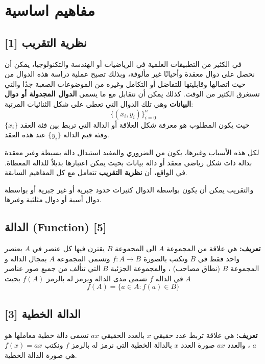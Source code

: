 \chapter{مفاهيم اساسية}
	
	\section{نظرية التقريب  [1]}
	
	في الكثير من التطبيقات العلمية في الرياضيات أو الهندسة والتكنولوجيا، يمكن أن نحصل على دوال معقدة وأحيانًا غير مألوفة، وبذلك تصبح عملية دراسة هذه الدوال من حيث اتصالها وقابليتها للتفاضل أو التكامل وغيره من الموضوعات الصعبة جدًا والتي تستغرق الكثير من الوقت.  
	كذلك يمكن أن نتقابل مع ما يسمى \textbf{الدوال المجدولة أو دوال البيانات} وهي تلك الدوال التي تعطى على شكل الثنائيات المرتبة:
	\[
	\{ (x_i, y_i) \}_{i=0}^{n}
	\]
	حيث يكون المطلوب هو معرفة شكل العلاقة أو الدالة التي تربط بين فئة العقد \(\{x_i\}\) وفئة قيم الدالة \(\{y_i\}\) عند هذه العقد.
	
	لكل هذه الأسباب وغيرها، يكون من الضروري والمفيد استبدال دالة بسيطة وغير معقدة بدالة ذات شكل رياضي معقد أو دالة بيانات بحيث يمكن اعتبارها بديلاً للدالة المعطاة. في الواقع، أن \textbf{نظرية التقريب} تتعامل مع كل المفاهيم السابقة.  
	
	والتقريب يمكن أن يكون بواسطة الدوال كثيرات حدود جبرية أو غير جبرية أو بواسطة دوال أسية أو دوال مثلثية وغيرها.
	
	\section{الدالة (Function) [5]}
	
	\textbf{تعريف:}  
هي علاقة من المجموعة $A$ الى المجموعة $B$ يقترن فيها كل عنصر في $A$ بعنصر واحد فقط  في $B$ وتكتب بالصورة $f:A\to B$ وتسمى المجموعة $A$ بمجال الدالة و المجموعة $B$ (نطاق مصاحب) ، والمجموعة الجزئية $B$ التي تتألف من جميع صور عناصر $A$ في الدالة $f$ تسمى مدى الدالة ويرمز له بالرمز $f(A)$ بحيث
\[
f(A) = \{a\in A : f(a) \in B\}
\]
	
	\section{الدالة الخطية  [3]}
	
	\textbf{تعريف:}  
هي علاقة تربط عدد حقيقي $x$ بالعدد الحقيقي  $ax$ تسمى دالة خطية معاملها هو $a$ ، والعدد $ax$ صورة العدد $x$ بالدالة الخطية التي نرمز له بالرمز $f$ ونكتب $f(x) = ax$ هي صورة الدالة الخطية.

